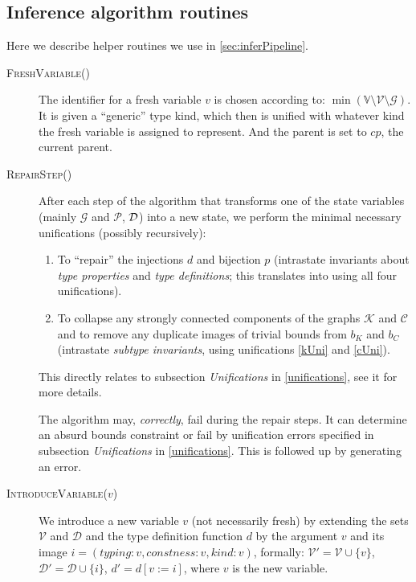 \subsection{Inference algorithm routines}
\label{sec:inferRoutines}

Here we describe helper routines we use in \cref{sec:inferPipeline}.

\begin{description}
    \item[\textsc{FreshVariable()}] The identifier for a fresh variable $v$ is chosen according to: \linebreak $\min \left(\mathbb{V} \setminus \mathcal{V} \setminus \mathcal{G}\right)$. It is given a ``generic'' type kind, which then is unified with whatever kind the fresh variable is assigned to represent. And the parent is set to $cp$, the current parent.

    \item[\textsc{RepairStep()}] After each step of the algorithm that transforms one of the state variables (mainly $\mathcal{G}$ and $\mathcal{P}$, $\mathcal{D}$) into a new state, we perform the minimal necessary unifications (possibly recursively):

    \begin{enumerate}
        \item To ``repair'' the injections $d$ and bijection $p$ (intrastate invariants about \emph{type properties} and \emph{type definitions}; this translates into using all four unifications).

        \item To collapse any strongly connected components of the graphs $\mathcal{K}$ and  $\mathcal{C}$ and to remove any duplicate images of trivial bounds from $b_K$ and $b_C$ (intrastate \emph{subtype invariants}, using unifications \ref{kUni} and \ref{cUni}).
    \end{enumerate}

    This directly relates to subsection \emph{Unifications} in \cref{unifications}, see it for more details.

    The algorithm may, \emph{correctly}, fail during the repair steps. It can determine an absurd bounds constraint or fail by unification errors specified in subsection \emph{Unifications} in \cref{unifications}. This is followed up by generating an error.

    \item[\textsc{IntroduceVariable($v$)}] We introduce a new variable $v$ (not necessarily fresh) by extending the sets $\mathcal{V}$ and $\mathcal{D}$ and the type definition function $d$ by the argument $v$ and its image $i = (typing: v, constness: v, kind: v)$, formally: $\mathcal{V}' = \mathcal{V} \cup \{v\}$, $\mathcal{D}' = \mathcal{D} \cup \{i\}$, $d' = d [v := i]$, where $v$ is the new variable.


\end{description}
